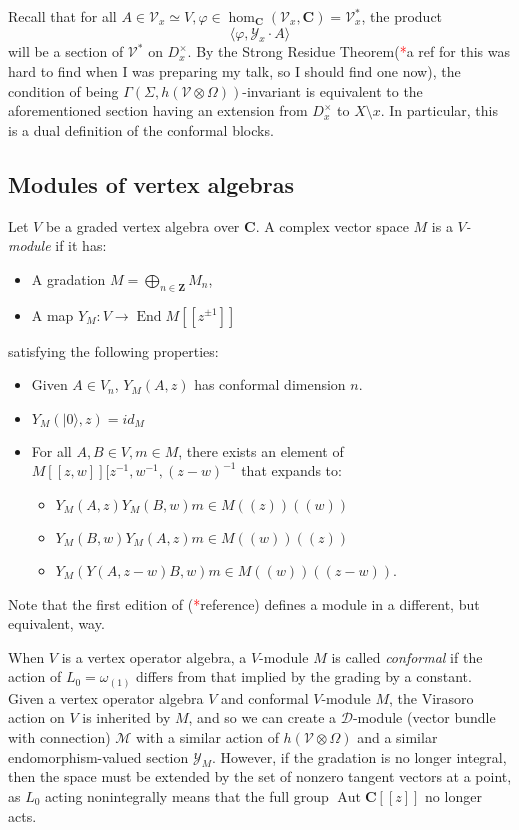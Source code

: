 \documentclass{article}
\newcommand{\CC}{\mathbold{C}}
\newcommand{\ZZ}{\mathbold{Z}}
\newcommand{\vac}{|0\rangle}
\newcommand{\Dd}{\mathcal{D}}
\newcommand{\Mm}{\mathcal{M}}
\newcommand{\Vv}{\mathcal{V}}
\newcommand{\Yy}{\mathcal{Y}}
\newcommand{\tk}{\textcolor{red}{*}}
\DeclareMathOperator{\End}{End}
\DeclareMathOperator{\Aut}{Aut}
\begin{document}
Recall that for all $A \in \Vv_x \simeq V, \varphi \in \hom_\CC(\Vv_x,\CC) = \Vv_x^*$, the product
\[\langle \varphi,\Yy_x \cdot A \rangle \]
will be a section of $\Vv^*$ on $D_x^\times$.  By the Strong Residue Theorem(\tk a ref for this was hard to find when I was preparing my talk, so I should find one now), the condition of being $\Gamma(\Sigma,h(\Vv \otimes \Omega))$-invariant is equivalent to the aforementioned section having an extension from $D_x^\times$ to $X \setminus x$.  In particular, this is a dual definition of the conformal blocks.

\subsection{Modules of vertex algebras}
Let $V$ be a graded vertex algebra over $\CC$.  A complex vector space $M$ is a \textit{$V$-module} if it has:
\begin{itemize}
\item A gradation $M=\bigoplus_{n \in \ZZ}M_n$,
\item A map $Y_M: V \rightarrow \End{M[[z^{\pm 1}]]}$
\end{itemize}
satisfying the following properties:
\begin{itemize}
\item Given $A \in V_n$, $Y_M(A,z)$ has conformal dimension $n$.
\item $Y_M(\vac,z)=id_M$
\item For all $A,B \in V, m \in M$, there exists an element of $M[[z,w]][z^{-1},w^{-1},(z-w)^{-1}$ that expands to:
  \begin{itemize}
  \item $Y_M(A,z)Y_M(B,w)m \in M((z))((w))$
  \item $Y_M(B,w)Y_M(A,z)m \in M((w))((z))$
  \item $Y_M(Y(A,z-w)B,w)m \in M((w))((z-w))$.
  \end{itemize}

\end{itemize}
Note that the first edition of (\tk reference) defines a module in a different, but equivalent, way.

When $V$ is a vertex operator algebra, a $V$-module $M$ is called \textit{conformal} if the action of $L_0=\omega_{(1)}$ differs from that implied by the grading by a constant.  Given a vertex operator algebra $V$ and conformal $V$-module $M$, the Virasoro action on $V$ is inherited by $M$, and so we can create a $\Dd$-module (vector bundle with connection) $\Mm$ with a similar action of $h(\Vv \otimes \Omega)$ and a similar endomorphism-valued section $\Yy_M$.  However, if the gradation is no longer integral, then the space must be extended by the set of nonzero tangent vectors at a point, as $L_0$ acting nonintegrally means that the full group $\Aut \CC[[z]]$ no longer acts.
\end{document}
